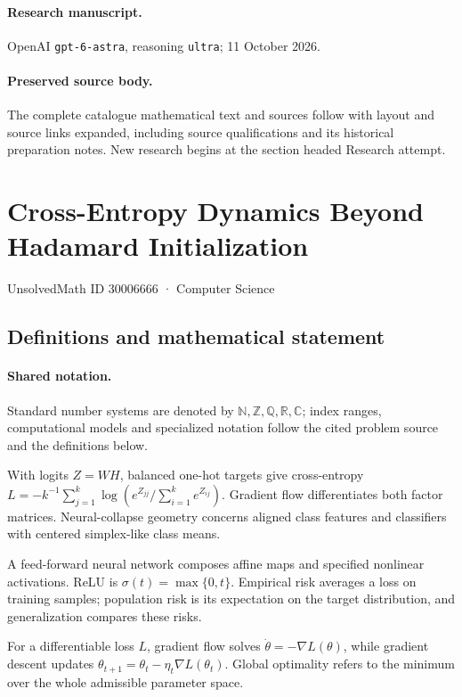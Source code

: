 \documentclass[11pt]{article}
\begin{document}
\paragraph{Research manuscript.} OpenAI \texttt{gpt-6-astra}, reasoning \texttt{ultra}; 11 October 2026.
\paragraph{Preserved source body.} The complete catalogue mathematical text and sources follow with layout and source links expanded, including source qualifications and its historical preparation notes. New research begins at the section headed Research attempt.

\section{Cross-Entropy Dynamics Beyond Hadamard Initialization}\label{30006666}
{\small UnsolvedMath ID 30006666 · Computer Science}
\subsection{Definitions and mathematical statement}

\paragraph{Shared notation.}Standard number systems are denoted by $\mathbb N,\mathbb Z,\mathbb Q,\mathbb R,\mathbb C$; index ranges, computational models and specialized notation follow the cited problem source and the definitions below.


With logits $Z=WH$, balanced one-hot targets give cross-entropy $L=-k^{-1}\sum_{j=1}^k\log(e^{Z_{jj}}/\sum_{i=1}^ke^{Z_{ij}})$. Gradient flow differentiates both factor matrices. Neural-collapse geometry concerns aligned class features and classifiers with centered simplex-like class means.

A feed-forward neural network composes affine maps and specified nonlinear activations. ReLU is $\sigma(t)=\max\{0,t\}$. Empirical risk averages a loss on training samples; population risk is its expectation on the target distribution, and generalization compares these risks.

For a differentiable loss $L$, gradient flow solves $\dot\theta=-\nabla L(\theta)$, while gradient descent updates $\theta_{t+1}=\theta_t-\eta_t\nabla L(\theta_t)$. Global optimality refers to the minimum over the whole admissible parameter space.
\end{document}
